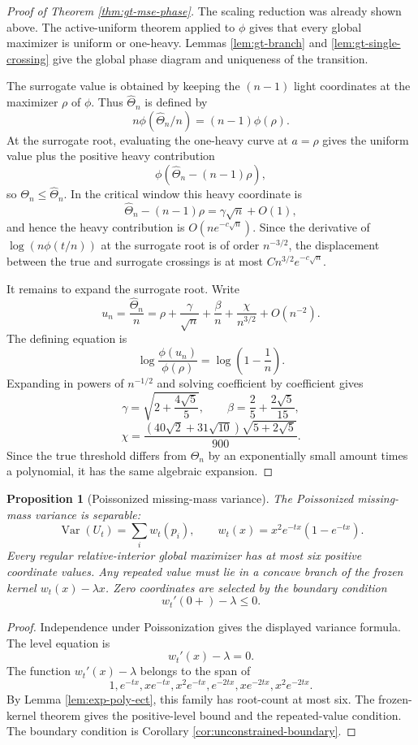 \documentclass[11pt]{article}
\newtheorem{proposition}[theorem]{Proposition}
\theoremstyle{definition}
\begin{document}
\begin{proof}[Proof of Theorem \ref{thm:gt-mse-phase}]
The scaling reduction was already shown above.  The active-uniform theorem applied to $\phi$ gives that every global maximizer is uniform or one-heavy.  Lemmas \ref{lem:gt-branch} and \ref{lem:gt-single-crossing} give the global phase diagram and uniqueness of the transition.

The surrogate value is obtained by keeping the $(n-1)$ light coordinates at the maximizer $\rho$ of $\phi$.  Thus $\widehat\Theta_n$ is defined by
\[
  n\phi(\widehat\Theta_n/n)=(n-1)\phi(\rho).
\]
At the surrogate root, evaluating the one-heavy curve at $a=\rho$ gives the uniform value plus the positive heavy contribution
\[
  \phi(\widehat\Theta_n-(n-1)\rho),
\]
so $\Theta_n\le\widehat\Theta_n$.  In the critical window this heavy coordinate is
\[
  \widehat\Theta_n-(n-1)\rho=\gamma\sqrt n+O(1),
\]
and hence the heavy contribution is $O(n e^{-c\sqrt n})$.  Since the derivative of
$\log(n\phi(t/n))$ at the surrogate root is of order $n^{-3/2}$, the displacement between the true and surrogate crossings is at most $C n^{3/2}e^{-c\sqrt n}$.

It remains to expand the surrogate root.  Write
\[
  u_n=\frac{\widehat\Theta_n}{n}=\rho+\frac{\gamma}{\sqrt n}
       +\frac{\beta}{n}+\frac{\chi}{n^{3/2}}+O(n^{-2}).
\]
The defining equation is
\[
  \log\frac{\phi(u_n)}{\phi(\rho)}=\log\left(1-\frac1n\right).
\]
Expanding in powers of $n^{-1/2}$ and solving coefficient by coefficient gives
\[
  \gamma=\sqrt{2+\frac{4\sqrt5}{5}},
  \qquad
  \beta=\frac25+\frac{2\sqrt5}{15},
\]
\[
  \chi=\frac{(40\sqrt2+31\sqrt{10})\sqrt{5+2\sqrt5}}{900}.
\]
Since the true threshold differs from $\widehat\Theta_n$ by an exponentially small amount times a polynomial, it has the same algebraic expansion.
\end{proof}


\begin{proposition}[Poissonized missing-mass variance]
The Poissonized missing-mass variance is separable:
\[
  \operatorname{Var}(U_t)=\sum_i w_t(p_i),
  \qquad
  w_t(x)=x^2 e^{-t x}(1-e^{-t x}).
\]
Every regular relative-interior global maximizer has at most six positive coordinate values.  Any repeated value must lie in a concave branch of the frozen kernel $w_t(x)-\lambda x$.  Zero coordinates are selected by the boundary condition
\[
  w_t'(0+)-\lambda\le0.
\]
\end{proposition}

\begin{proof}
Independence under Poissonization gives the displayed variance formula.  The level equation is
\[
  w_t'(x)-\lambda=0.
\]
The function $w_t'(x)-\lambda$ belongs to the span of
\[
  1,
  e^{-t x},x e^{-t x},x^2e^{-t x},
  e^{-2t x},x e^{-2t x},x^2e^{-2t x}.
\]
By Lemma \ref{lem:exp-poly-ect}, this family has root-count at most six.  The frozen-kernel theorem gives the positive-level bound and the repeated-value condition.  The boundary condition is Corollary \ref{cor:unconstrained-boundary}.
\end{proof}
\end{document}
